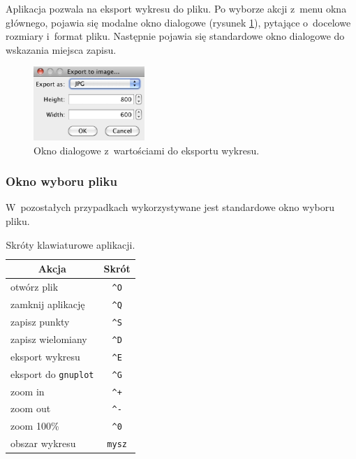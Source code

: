 \documentclass[10pt,a4paper]{article}
\begin{document}
Aplikacja pozwala na eksport wykresu do pliku. Po wyborze akcji z~menu okna
głównego, pojawia się modalne okno dialogowe (rysunek
\ref{fig:eksport-wykresu}), pytające o~docelowe rozmiary i~format pliku.
Następnie pojawia się standardowe okno dialogowe do wskazania miejsca zapisu.

\begin{figure}[h]
  \centering
  \includegraphics[width=0.374\textwidth]{images/eksport-wykresu}
  \caption{Okno dialogowe z~wartościami do eksportu wykresu.}
  \label{fig:eksport-wykresu}
\end{figure}

\subsubsection{Okno wyboru pliku}

W~pozostałych przypadkach wykorzystywane jest standardowe okno wyboru pliku.

\begin{table}[p]
  \centering
  \begin{tabular}{l c}
    \toprule
    \multicolumn{1}{c}{\bf Akcja} & {\bf Skrót} \\
    \midrule
    otwórz plik              &  \verb|^O|  \\
    zamknij aplikację        &  \verb|^Q|  \\
    zapisz punkty            &  \verb|^S|  \\
    zapisz wielomiany        &  \verb|^D|  \\
    eksport wykresu          &  \verb|^E|  \\
    eksport do {\tt gnuplot} &  \verb|^G|  \\
    \midrule
    zoom in                  &  \verb|^+|  \\
    zoom out                 &  \verb|^-|  \\
    zoom 100\%               &  \verb|^0|  \\
    obszar wykresu           &  \verb|mysz|  \\
    \bottomrule
  \end{tabular}
  \caption{Skróty klawiaturowe aplikacji.}
  \label{tab:skroty}
\end{table}
\end{document}
